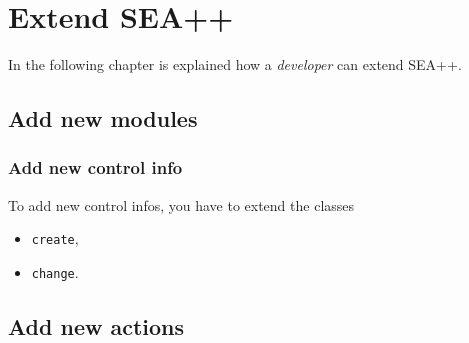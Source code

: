 

\chapter{Extend SEA++}
\label{ch:extend-seapp}

In the following chapter is explained how a \emph{developer} can extend SEA++.
\section{Add new modules}

\subsection{Add new control info}
To add new control infos, you have to extend the classes
%
\begin{itemize}
\item \texttt{create},
\item \texttt{change}.
\end{itemize}


\section{Add new actions}



